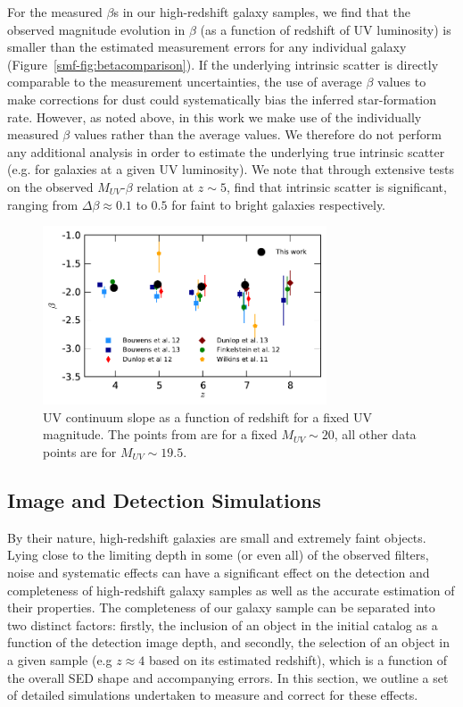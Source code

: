 For the measured $\beta$s in our high-redshift galaxy samples, we find that the observed magnitude evolution in $\beta$ (as a function of redshift of UV luminosity) is smaller than the estimated measurement errors for any individual galaxy (Figure~\ref{smf-fig:betacomparison}). If the underlying intrinsic scatter is directly comparable to the measurement uncertainties, the use of average $\beta$ values to make corrections for dust could systematically bias the inferred star-formation rate. However, as noted above, in this work we make use of the individually measured $\beta$ values rather than the average values. We therefore do not perform any additional analysis in order to estimate the underlying true intrinsic scatter (e.g. for galaxies at a given UV luminosity). We note that through extensive tests on the observed $M_{UV}$-$\beta$ relation at $z\sim5$, \citet{Rogers:2014bn} find that intrinsic scatter is significant, ranging from $\Delta\beta \approx 0.1$ to $0.5$ for faint to bright galaxies respectively.

\begin{figure}
\centering
\includegraphics[width=0.75\textwidth]{plots/figB3.pdf}
\caption[UV continuum slope as a function of redshift for a fixed UV magnitude.]{UV continuum slope as a function of redshift for a fixed UV magnitude. The points from \citep{2012ApJ...756..164F} are for a fixed $M_{UV} \sim 20$, all other data points are for $M_{UV} \sim 19.5$.}
\label{smf-fig:beta_z}
\end{figure}

\subsection{Image and Detection Simulations}\label{smf-sec:simulations}
By their nature, high-redshift galaxies are small and extremely faint objects. Lying close to the limiting depth in some (or even all) of the observed filters, noise and systematic effects can have a significant effect on the detection and completeness of high-redshift galaxy samples as well as the accurate estimation of their properties. The completeness of our galaxy sample can be separated into two distinct factors: firstly, the inclusion of an object in the initial catalog as a function of the detection image depth, and secondly, the selection of an object in a given sample (e.g $z\approx4$ based on its estimated redshift), which is a function of the overall SED shape and accompanying errors. In this section, we outline a set of detailed simulations undertaken to measure and correct for these effects.


